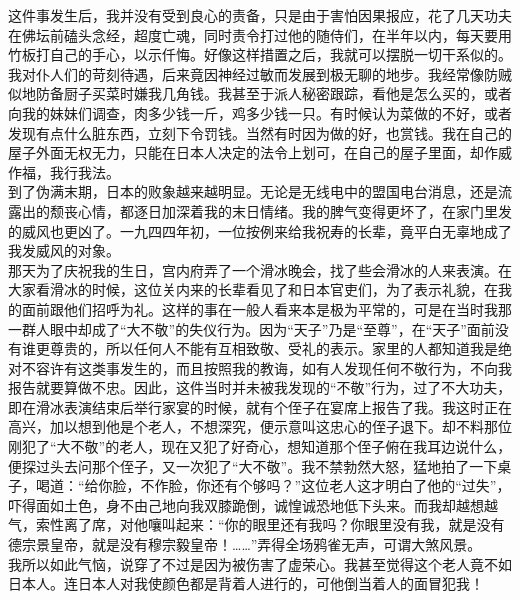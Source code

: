 这件事发生后，我并没有受到良心的责备，只是由于害怕因果报应，花了几天功夫在佛坛前磕头念经，超度亡魂，同时责令打过他的随侍们，在半年以内，每天要用竹板打自己的手心，以示仟悔。好像这样措置之后，我就可以摆脱一切干系似的。\\

我对仆人们的苛刻待遇，后来竟因神经过敏而发展到极无聊的地步。我经常像防贼似地防备厨子买菜时嫌我几角钱。我甚至于派人秘密跟踪，看他是怎么买的，或者向我的妹妹们调查，肉多少钱一斤，鸡多少钱一只。有时候认为菜做的不好，或者发现有点什么脏东西，立刻下令罚钱。当然有时因为做的好，也赏钱。我在自己的屋子外面无权无力，只能在日本人决定的法令上划可，在自己的屋子里面，却作威作福，我行我法。\\

到了伪满末期，日本的败象越来越明显。无论是无线电中的盟国电台消息，还是流露出的颓丧心情，都逐日加深着我的末日情绪。我的脾气变得更坏了，在家门里发的威风也更凶了。一九四四年初，一位按例来给我祝寿的长辈，竟平白无辜地成了我发威风的对象。\\

那天为了庆祝我的生日，宫内府弄了一个滑冰晚会，找了些会滑冰的人来表演。在大家看滑冰的时候，这位关内来的长辈看见了和日本官吏们，为了表示礼貌，在我的面前跟他们招呼为礼。这样的事在一般人看来本是极为平常的，可是在当时我那一群人眼中却成了“大不敬”的失仪行为。因为“天子”乃是“至尊”，在“天子”面前没有谁更尊贵的，所以任何人不能有互相致敬、受礼的表示。家里的人都知道我是绝对不容许有这类事发生的，而且按照我的教诲，如有人发现任何不敬行为，不向我报告就要算做不忠。因此，这件当时并未被我发现的“不敬”行为，过了不大功夫，即在滑冰表演结束后举行家宴的时候，就有个侄子在宴席上报告了我。我这时正在高兴，加以想到他是个老人，不想深究，便示意叫这忠心的侄子退下。却不料那位刚犯了“大不敬”的老人，现在又犯了好奇心，想知道那个侄子俯在我耳边说什么，便探过头去问那个侄子，又一次犯了“大不敬”。我不禁勃然大怒，猛地拍了一下桌子，喝道：“给你脸，不作脸，你还有个够吗？”这位老人这才明白了他的“过失”，吓得面如土色，身不由己地向我双膝跪倒，诚惶诚恐地低下头来。而我却越想越气，索性离了席，对他嚷叫起来：“你的眼里还有我吗？你眼里没有我，就是没有德宗景皇帝，就是没有穆宗毅皇帝！……”弄得全场鸦雀无声，可谓大煞风景。\\

我所以如此气恼，说穿了不过是因为被伤害了虚荣心。我甚至觉得这个老人竟不如日本人。连日本人对我使颜色都是背着人进行的，可他倒当着人的面冒犯我！\\

